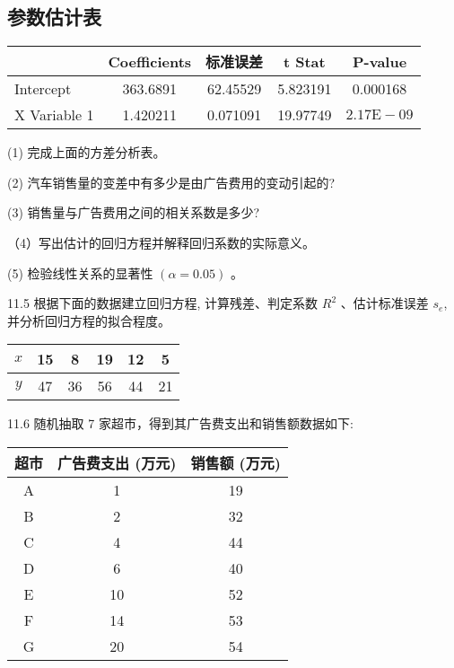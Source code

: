 \documentclass[10pt]{article}
\begin{document}
\begin{CJK*}{UTF8}{bsmi}
\section*{参数估计表}
\begin{center}
\begin{tabular}{lcccc}
\hline
 & Coefficients & 标准误差 & t Stat & P-value \\
\hline
Intercept & 363.6891 & 62.45529 & 5.823191 & 0.000168 \\
X Variable 1 & 1.420211 & 0.071091 & 19.97749 & $2.17 \mathrm{E}-09$ \\
\hline
\end{tabular}
\end{center}

(1) 完成上面的方差分析表。

(2) 汽车销售量的变差中有多少是由广告费用的变动引起的?

(3) 销售量与广告费用之间的相关系数是多少?

（4）写出估计的回归方程并解释回归系数的实际意义。

(5) 检验线性关系的显著性 $(\alpha=0.05)$ 。

11.5 根据下面的数据建立回归方程, 计算残差、判定系数 $R^{2}$ 、估计标准误差 $s_{e}$, 并分析回归方程的拟合程度。

\begin{center}
\begin{tabular}{cccccc}
\hline
$x$ & 15 & 8 & 19 & 12 & 5 \\
\hline
$y$ & 47 & 36 & 56 & 44 & 21 \\
\hline
\end{tabular}
\end{center}

11.6 随机抽取 7 家超市，得到其广告费支出和销售额数据如下:

\begin{center}
\begin{tabular}{ccc}
\hline
超市 & 广告费支出 (万元) & 销售额 (万元) \\
\hline
A & 1 & 19 \\
B & 2 & 32 \\
C & 4 & 44 \\
D & 6 & 40 \\
E & 10 & 52 \\
F & 14 & 53 \\
G & 20 & 54 \\
\hline
\end{tabular}
\end{center}


\end{CJK*}
\end{document}
